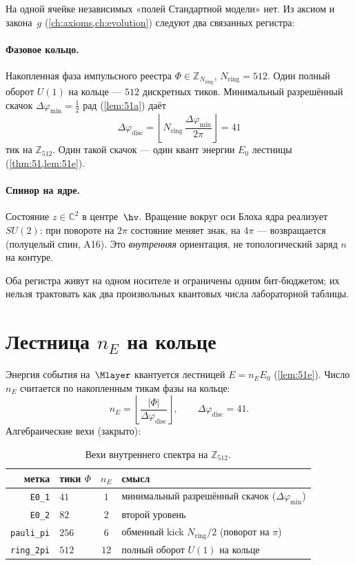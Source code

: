 На одной ячейке независимых «полей Стандартной модели» нет.
Из аксиом и закона~$g$ (\cref{ch:axioms,ch:evolution}) следуют два связанных регистра:

\paragraph{Фазовое кольцо.}
Накопленная фаза импульсного реестра
$\Phi\in\mathbb{Z}_{N_{\mathrm{ring}}}$, $N_{\mathrm{ring}}=512$.
Один полный оборот $U(1)$ на кольце --- $512$ дискретных тиков.
Минимальный разрешённый скачок $\Delta\varphi_{\min}=\tfrac12$ рад
(\cref{lem:51a}) даёт
\[
  \Delta\varphi_{\mathrm{disc}}
  = \left\lfloor N_{\mathrm{ring}}\,\frac{\Delta\varphi_{\min}}{2\pi}\right\rfloor
  = 41
\]
тик на $\mathbb{Z}_{512}$.
Один такой скачок --- один квант энергии $E_0$ лестницы (\cref{thm:51,lem:51e}).

\paragraph{Спинор на ядре.}
Состояние $z\in\mathbb{C}^2$ в центре~$\hv$.
Вращение вокруг оси Блоха ядра реализует $SU(2)$:
при повороте на $2\pi$ состояние меняет знак, на $4\pi$ --- возвращается
(полуцелый спин, A16).
Это \emph{внутренняя} ориентация, не топологический заряд $n$ на контуре.

Оба регистра живут на одном носителе и ограничены одним бит-бюджетом;
их нельзя трактовать как два произвольных квантовых числа лабораторной таблицы.

\section{Лестница $n_E$ на кольце}
\label{sec:floor0-ne-ladder}

Энергия события на~$\Mlayer$ квантуется лестницей $E=n_E E_0$ (\cref{lem:51e}).
Число $n_E$ считается по накопленным тикам фазы на кольце:
\[
  n_E = \left\lfloor \frac{|\Phi|}{\Delta\varphi_{\mathrm{disc}}}\right\rfloor,
  \qquad
  \Delta\varphi_{\mathrm{disc}} = 41.
\]
Алгебраические вехи (закрыто):

\begin{table}[htbp]
  \centering
  \caption{Вехи внутреннего спектра на $\mathbb{Z}_{512}$.}
  \label{tab:floor0-landmarks}
  \begin{tabular}{@{}rlcl@{}}
    \toprule
    метка & тики $\Phi$ & $n_E$ & смысл \\
    \midrule
    \texttt{E0\_1} & $41$ & $1$ & минимальный разрешённый скачок ($\Delta\varphi_{\min}$) \\
    \texttt{E0\_2} & $82$ & $2$ & второй уровень \\
    \texttt{pauli\_pi} & $256$ & $6$ & обменный kick $N_{\mathrm{ring}}/2$ (поворот на $\pi$) \\
    \texttt{ring\_2pi} & $512$ & $12$ & полный оборот $U(1)$ на кольце \\
    \bottomrule
  \end{tabular}
\end{table}

